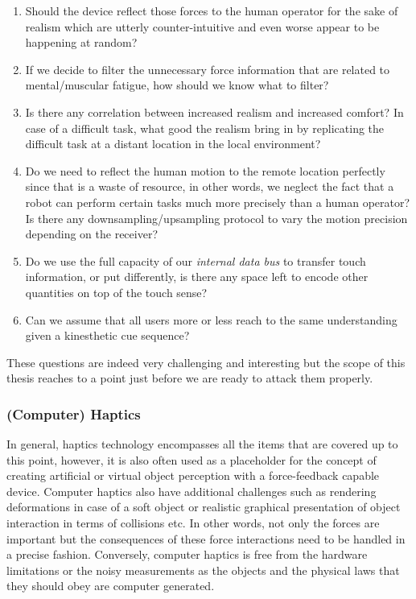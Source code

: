 \begin{enumerate}
	\item Should the device reflect those forces to the human operator for the sake of realism which are utterly counter-intuitive and even worse appear to be happening at random? 
    \item If we decide to filter the unnecessary force information that are related to mental/muscular fatigue, how should we know what to filter? 
    \item Is there any correlation between increased realism and increased comfort? In case of a difficult task, what good the realism bring in by replicating the difficult task at a distant location in the local environment?
    \item Do we need to reflect the human motion to the remote location perfectly since that is a waste of resource, in other words, we neglect the fact that a robot can perform certain tasks much more precisely than a human operator? Is there any downsampling/upsampling protocol to vary the motion precision depending on the receiver?
    \item Do we use the full capacity of our \emph{internal data bus} to transfer touch information, or put differently, is there any space left to encode other quantities on top of the touch sense?
    \item Can we assume that all users more or less reach to the same understanding given a kinesthetic cue sequence?
\end{enumerate}

These questions are indeed very challenging and interesting but the scope of this thesis reaches to a point just before we are ready to attack them properly.

\subsubsection[Haptics]{(Computer) Haptics}
In general, haptics technology encompasses all the items that are covered up to this point, however, it is also often used as a placeholder for the concept of creating artificial or virtual object perception with a force-feedback capable device. Computer haptics also have additional challenges such as rendering deformations in case of a soft object or realistic graphical presentation of object interaction in terms of collisions etc. In other words, not only the forces are important but the consequences of these force interactions need to be handled in a precise fashion. Conversely, computer haptics is free from the hardware limitations or the noisy measurements as the objects and the physical laws that they should obey are computer generated. 


